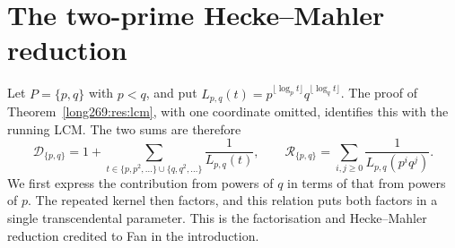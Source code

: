 \section{The two-prime Hecke--Mahler reduction}
\label{long269:sec:two-prime}

Let $P=\{p,q\}$ with $p<q$, and put
$L_{p,q}(t)=p^{\lfloor\log_p t\rfloor}q^{\lfloor\log_q t\rfloor}$.
The proof of Theorem~\ref{long269:res:lcm}, with one coordinate omitted,
identifies this with the running LCM. The two sums are therefore
\[
 \mathcal D_{\{p,q\}}
 =1+\sum_{t\in\{p,p^2,\ldots\}\cup\{q,q^2,\ldots\}}\frac1{L_{p,q}(t)},
 \qquad
 \mathcal R_{\{p,q\}}=\sum_{i,j\ge0}\frac1{L_{p,q}(p^iq^j)}.
\]
We first express the contribution from powers of $q$ in terms of that
from powers of $p$. The repeated kernel then factors, and this relation
puts both factors in a single transcendental parameter. This is the
factorisation and Hecke--Mahler reduction credited to Fan in the introduction.

